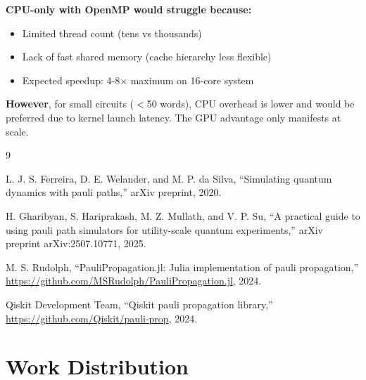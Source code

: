 \documentclass[11pt, a4paper]{article}
\begin{document}
\textbf{CPU-only with OpenMP would struggle because:}
\begin{itemize}
    \item Limited thread count (tens vs thousands)
    \item Lack of fast shared memory (cache hierarchy less flexible)
    \item Expected speedup: 4-8$\times$ maximum on 16-core system
\end{itemize}

\noindent \textbf{However}, for small circuits ($<$50 words), CPU overhead is lower and would be preferred due to kernel launch latency. The GPU advantage only manifests at scale.


\begin{thebibliography}{9}

L. J. S. Ferreira, D. E. Welander, and M. P. da Silva,
``Simulating quantum dynamics with pauli paths,''
arXiv preprint, 2020.

H. Gharibyan, S. Hariprakash, M. Z. Mullath, and V. P. Su,
``A practical guide to using pauli path simulators for utility-scale quantum experiments,''
arXiv preprint arXiv:2507.10771, 2025.

M. S. Rudolph,
``PauliPropagation.jl: Julia implementation of pauli propagation,''
\url{https://github.com/MSRudolph/PauliPropagation.jl}, 2024.

Qiskit Development Team,
``Qiskit pauli propagation library,''
\url{https://github.com/Qiskit/pauli-prop}, 2024.



\end{thebibliography}

\section{Work Distribution}
\end{document}

